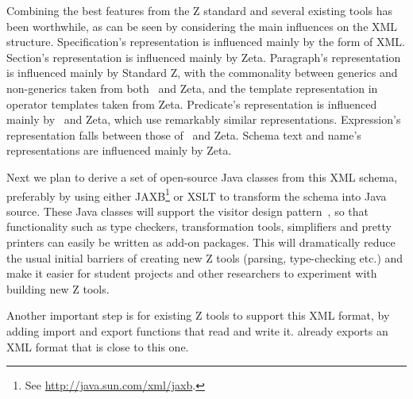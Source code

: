 \documentclass{llncs}  %
\newcommand{\Zeta}{Zeta}
\begin{document}
Combining the best features from the Z standard and several existing
tools has been worthwhile,
as can be seen by considering the main influences on the XML structure.
Specification's representation is influenced mainly by the form of XML.
Section's representation is influenced mainly by \Zeta.
Paragraph's representation is influenced mainly by Standard Z,
with the commonality between generics and non-generics taken from
both \CADiZ\ and \Zeta,
and the template representation in operator templates taken from \Zeta.
Predicate's representation is influenced mainly by \CADiZ\ and \Zeta,
which use remarkably similar representations.
Expression's representation falls between those of \CADiZ\ and \Zeta.
Schema text and name's representations are influenced mainly by \Zeta.

Next we plan to derive a set of open-source Java classes from this XML
schema, preferably by using either JAXB\footnote{See
  \url{http://java.sun.com/xml/jaxb}.} or XSLT to 
transform the schema into Java source. 
These Java classes will support the visitor design
pattern~\cite{gamma:design-patts95}, so that functionality such as type
checkers, 
transformation tools, simplifiers and pretty printers can easily be written
as add-on packages.  This will dramatically reduce the usual initial
barriers of creating new Z tools (parsing, type-checking etc.) and make it
easier for student projects and other researchers to experiment with
building new Z tools.

Another important step is for existing Z tools to support this
XML format, by adding import and export functions that read and write it.
{\CADiZ} already exports an XML format that is close to this one.

\begin{small}


\end{small}

\newpage
\appendix
\end{document}
